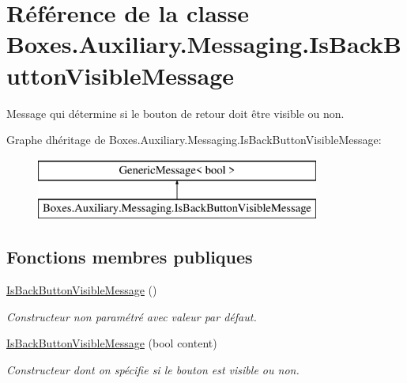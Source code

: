 \hypertarget{class_boxes_1_1_auxiliary_1_1_messaging_1_1_is_back_button_visible_message}{}\section{Référence de la classe Boxes.\+Auxiliary.\+Messaging.\+Is\+Back\+Button\+Visible\+Message}
\label{class_boxes_1_1_auxiliary_1_1_messaging_1_1_is_back_button_visible_message}


Message qui détermine si le bouton de retour doit être visible ou non.  


Graphe d\textquotesingle{}héritage de Boxes.\+Auxiliary.\+Messaging.\+Is\+Back\+Button\+Visible\+Message\+:\begin{figure}[H]
\begin{center}
\leavevmode
\includegraphics[height=2.000000cm]{class_boxes_1_1_auxiliary_1_1_messaging_1_1_is_back_button_visible_message}
\end{center}
\end{figure}
\subsection*{Fonctions membres publiques}
\begin{DoxyCompactItemize}
\item 
\hyperlink{class_boxes_1_1_auxiliary_1_1_messaging_1_1_is_back_button_visible_message_af82b8d485632d1c20d8d38aacc922b33}{Is\+Back\+Button\+Visible\+Message} ()
\begin{DoxyCompactList}\small\item\em Constructeur non paramétré avec valeur par défaut. \end{DoxyCompactList}\item 
\hyperlink{class_boxes_1_1_auxiliary_1_1_messaging_1_1_is_back_button_visible_message_a47a3304bc2be00e39f3aee25428a07d0}{Is\+Back\+Button\+Visible\+Message} (bool content)
\begin{DoxyCompactList}\small\item\em Constructeur dont on spécifie si le bouton est visible ou non. \end{DoxyCompactList}\end{DoxyCompactItemize}


